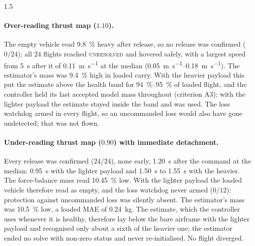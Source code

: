 \begin{spacing}{1.5}
\paragraph{Over-reading thrust map ($1.10$).} The empty vehicle read
\SI{9.8}{\percent} heavy after release, so no release was confirmed ($0/24$);
all $24$ flights reached \textsc{unresolved} and hovered safely, with a largest
speed from \SI{5}{\second} after it of \SI{0.11}{\meter\per\second} at the
median (\SIrange{0.05}{0.18}{\meter\per\second}). The estimator's mass was
\SI{9.4}{\percent} high in loaded carry. With the heavier payload this put the
estimate above the health band for \SIrange{94}{95}{\percent} of loaded flight, and the
controller held its last accepted model mass throughout (criterion A3); with the
lighter payload the estimate stayed inside the band and was used. The loss
watchdog armed in every flight, so an uncommanded loss would also have gone
undetected; that was not flown.

\paragraph{Under-reading thrust map ($0.90$) with immediate detachment.} Every
release was confirmed ($24/24$), none early, \SI{1.20}{\second} after the command
at the median: \SI{0.95}{\second} with the lighter payload and
\SI{1.50}{\second} to \SI{1.55}{\second} with the heavier. The force-balance mass
read \SI{10.45}{\percent} low. With the lighter payload the loaded vehicle
therefore read as empty, and the loss watchdog never armed ($0/12$): protection
against uncommanded loss was silently absent. The estimator's mass was
\SI{10.5}{\percent} low, a loaded MAE of \SI{0.24}{\kg}. The estimate, which
the controller uses whenever it is healthy, therefore lay below the bare airframe
with the lighter payload and recognised only about a sixth of the heavier one;
the estimator ended no solve
with non-zero status and never re-initialised. No flight diverged.


\end{spacing}
